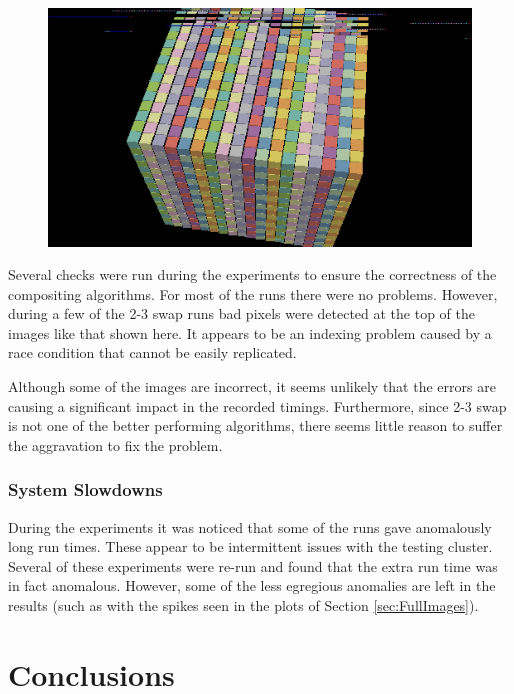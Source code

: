 \documentclass{vgtc}                          %
\newcommand*{\textalgorithm}[1]{\textsf{#1}\xspace}
\newcommand{\ttswap}{\textalgorithm{2-3 swap}}
\begin{document}
\begin{figure}
  \includegraphics[width=\linewidth]{bad-composite-2-3-swap}
\end{figure}
Several checks were run during the experiments to ensure the correctness of the compositing algorithms.
For most of the runs there were no problems.
However, during a few of the \ttswap runs bad pixels were detected at the top of the images like that shown here.
It appears to be an indexing problem caused by a race condition that cannot be easily replicated.

Although some of the images are incorrect, it seems unlikely that the errors are causing a significant impact in the recorded timings.
Furthermore, since \ttswap is not one of the better performing algorithms, there seems little reason to suffer the aggravation to fix the problem.

\subsubsection{System Slowdowns}

During the experiments it was noticed that some of the runs gave anomalously long run times.
These appear to be intermittent issues with the testing cluster.
Several of these experiments were re-run and found that the extra run time was in fact anomalous.
However, some of the less egregious anomalies are left in the results (such as with the spikes seen in the plots of Section \ref{sec:FullImages}).

\section{Conclusions}
\end{document}
